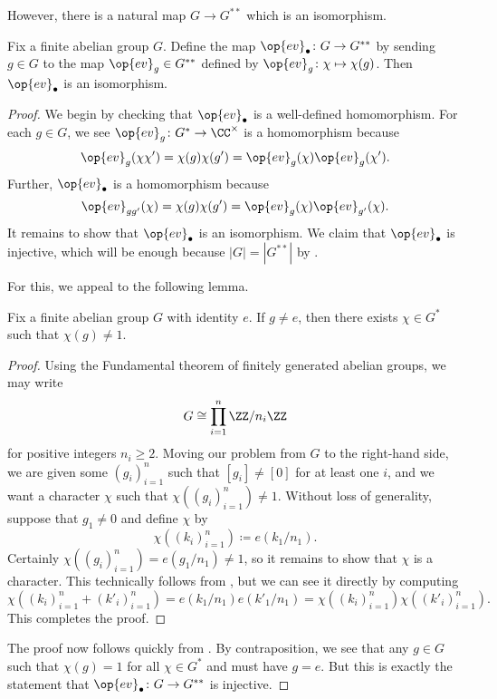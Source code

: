 \documentclass[../notes.tex]{subfiles}
\begin{document}
However, there is a natural map $G\to G^{**}$ which is an isomorphism.
\begin{proposition}
	Fix a finite abelian group $G$. Define the map $\op{ev}_\bullet\colon G\to G^{**}$ by sending $g\in G$ to the map $\op{ev}_g\in G^{**}$ defined by $\op{ev}_g\colon\chi\mapsto\chi(g)$. Then $\op{ev}_\bullet$ is an isomorphism.
\end{proposition}
\begin{proof}
	We begin by checking that $\op{ev}_\bullet$ is a well-defined homomorphism. For each $g\in G$, we see $\op{ev}_g\colon G^*\to\CC^\times$ is a homomorphism because
	\[\op{ev}_g(\chi\chi')=\chi(g)\chi(g')=\op{ev}_g(\chi)\op{ev}_g(\chi').\]
	Further, $\op{ev}_\bullet$ is a homomorphism because
	\[\op{ev}_{gg'}(\chi)=\chi(g)\chi(g')=\op{ev}_g(\chi)\op{ev}_{g'}(\chi).\]
	It remains to show that $\op{ev}_\bullet$ is an isomorphism. We claim that $\op{ev}_\bullet$ is injective, which will be enough because $|G|=|G^{**}|$ by .

	For this, we appeal to the following lemma.
	\begin{lemma} \label{lem:annoying-double-dual-lemma}
		Fix a finite abelian group $G$ with identity $e$. If $g\ne e$, then there exists $\chi\in G^*$ such that $\chi(g)\ne1$.
	\end{lemma}
	\begin{proof}
		Using the Fundamental theorem of finitely generated abelian groups, we may write
		\[G\cong\prod_{i=1}^n\ZZ/n_i\ZZ\]
		for positive integers $n_i\ge2$. Moving our problem from $G$ to the right-hand side, we are given some $(g_i)_{i=1}^n$ such that $[g_i]\ne[0]$ for at least one $i$, and we want a character $\chi$ such that $\chi\left((g_i)_{i=1}^n\right)\ne1$. Without loss of generality, suppose that $g_1\ne0$ and define $\chi$ by
		\[\chi\left((k_i)_{i=1}^n\right)\coloneqq e(k_1/n_1).\]
		Certainly $\chi\left((g_i)_{i=1}^n\right)=e(g_1/n_1)\ne1$, so it remains to show that $\chi$ is a character. This technically follows from , but we can see it directly by computing
		\[\chi\left((k_i)_{i=1}^n+(k'_i)_{i=1}^n\right)=e(k_1/n_1)e(k'_1/n_1)=\chi\left((k_i)_{i=1}^n\right)\chi\left((k'_i)_{i=1}^n\right).\]
		This completes the proof.
	\end{proof}
	The proof now follows quickly from . By contraposition, we see that any $g\in G$ such that $\chi(g)=1$ for all $\chi\in G^*$ and must have $g=e$. But this is exactly the statement that $\op{ev}_\bullet\colon G\to G^{**}$ is injective.
\end{proof}
\end{document}
